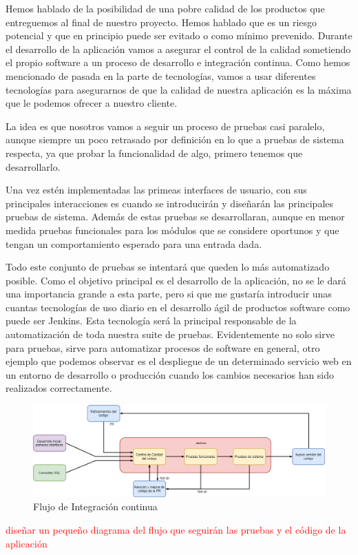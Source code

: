 Hemos hablado de la posibilidad de una pobre calidad de los productos que entreguemos al final de nuestro proyecto. Hemos hablado que es un riesgo potencial y que en principio puede ser evitado o como mínimo prevenido. Durante el desarrollo de la aplicación vamos a asegurar el control de la calidad sometiendo el propio software a un proceso de desarrollo e integración continua. Como hemos mencionado de pasada en la parte de tecnologías, vamos a usar diferentes tecnologías para asegurarnos de que la calidad de nuestra aplicación es la máxima que le podemos ofrecer a nuestro cliente. 

La idea es que nosotros vamos a seguir un proceso de pruebas casi paralelo, aunque siempre un poco retrasado por definición en lo que a pruebas de sistema respecta, ya que probar la funcionalidad de algo, primero tenemos que desarrollarlo. 

Una vez estén implementadas las primeas interfaces de usuario, con sus principales interacciones es cuando se introducirán y diseñarán las principales pruebas de sistema. Además de estas pruebas se desarrollaran, aunque en menor medida pruebas funcionales para los módulos que se considere oportunos y que tengan un comportamiento esperado para una entrada dada. 

Todo este conjunto de pruebas se intentará que queden lo más automatizado posible. Como el objetivo principal es el desarrollo de la aplicación, no se le dará una importancia grande a esta parte, pero si que me gustaría introducir unas cuantas tecnologías de uso diario en el desarrollo ágil de productos software como puede ser Jenkins. Esta tecnología será la principal responsable de la automatización de toda nuestra suite de pruebas. Evidentemente no solo sirve para pruebas, sirve para automatizar procesos de software en general, otro ejemplo que podemos observar es el despliegue de un determinado servicio web en un entorno de desarrollo o producción cuando los cambios necesarios han sido realizados correctamente. 

\begin{figure}[H]
    \centering
    \includegraphics[scale=0.4]{imagenes/planificacionGestion/cicd.png}
    \caption{Flujo de Integración continua}
    \label{fig:cicd}
\end{figure}

\textcolor{red}{diseñar un pequeño diagrama del flujo que seguirán las pruebas y el código de la aplicación}
